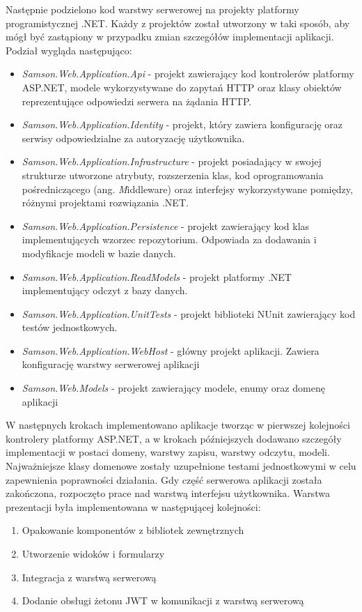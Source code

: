 \documentclass[a4paper,twoside,12pt]{book}
\newcommand{\obcy}[1]{\emph{#1}}
\newcommand{\ang}[1]{{\selectlanguage{british}\obcy{#1}}}
\begin{document}
	Następnie podzielono kod warstwy serwerowej na projekty platformy programistycznej .NET. Każdy z projektów został utworzony w taki sposób, aby mógł być zastąpiony w przypadku zmian szczegółów implementacji aplikacji. Podział wygląda następująco:
	\begin{itemize}
		\item \textit{Samson.Web.Application.Api} - projekt zawierający kod kontrolerów platformy ASP.NET, modele wykorzystywane do zapytań HTTP oraz klasy obiektów reprezentujące odpowiedzi serwera na żądania HTTP.
		\item \textit{Samson.Web.Application.Identity} - projekt, który zawiera konfigurację oraz serwisy odpowiedzialne za autoryzację użytkownika.
		\item \textit{Samson.Web.Application.Infrastructure} - projekt posiadający w swojej strukturze utworzone atrybuty, rozszerzenia klas, kod oprogramowania pośredniczącego (ang. \ang Middleware) oraz interfejsy wykorzystywane pomiędzy, różnymi projektami rozwiązania .NET.
		\item \textit{Samson.Web.Application.Persistence} - projekt zawierający kod klas implementujących wzorzec repozytorium. Odpowiada za dodawania i modyfikacje modeli w bazie danych.
		\item \textit{Samson.Web.Application.ReadModels} - projekt platformy .NET implementujący odczyt z bazy danych.
		\item \textit{Samson.Web.Application.UnitTests} - projekt biblioteki NUnit zawierający kod testów jednostkowych.
		\item \textit{Samson.Web.Application.WebHost} - główny projekt aplikacji. Zawiera konfigurację warstwy serwerowej aplikacji
		\item \textit{Samson.Web.Models} - projekt zawierający modele, enumy oraz domenę aplikacji
	\end{itemize}
	
	W następnych krokach implementowano aplikacje tworząc w pierwszej kolejności kontrolery platformy ASP.NET, a w krokach późniejszych dodawano szczegóły implementacji w postaci domeny, warstwy zapisu, warstwy odczytu, modeli. Najważniejsze klasy domenowe zostały uzupełnione testami jednostkowymi w celu zapewnienia poprawności działania. Gdy część serwerowa aplikacji została zakończona, rozpoczęto prace nad warstwą interfejsu użytkownika. Warstwa prezentacji była implementowana w następującej kolejności:
	\begin{enumerate}
		\item Opakowanie komponentów z bibliotek zewnętrznych
		\item Utworzenie widoków i formularzy
		\item Integracja z warstwą serwerową
		\item Dodanie obsługi żetonu JWT w komunikacji z warstwą serwerową
	\end{enumerate}
\end{document}

